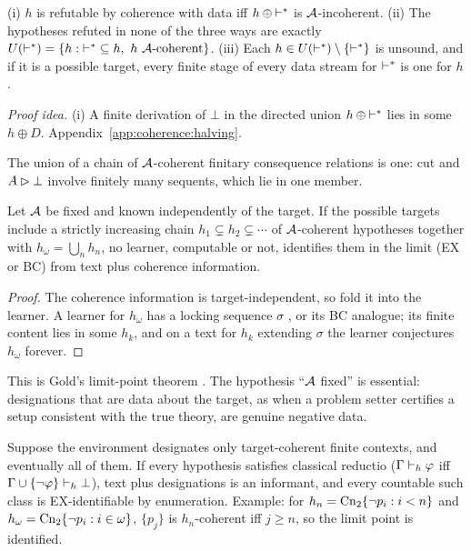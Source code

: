 \begin{theorem}\label{thm:coherence:silent}
\textup{(i)} $h$ is refutable by coherence with data iff $h\oplus{\vdash^{*}}$ is $\mathcal{A}$-incoherent. \textup{(ii)} The hypotheses refuted in none of the three ways are exactly $U(\dstar)=\{h:{\dstar}\subseteq h,\ h\ \Ac\text{-coherent}\}$. \textup{(iii)} Each $h\in U(\vdash^{*})\setminus\{\vdash^{*}\}$ is unsound, and if it is a possible target, every finite stage of every data stream for $\vdash^{*}$ is one for $h$.
\end{theorem}

\noindent\emph{Proof idea.} (i) A finite derivation of $\bot$ in the directed union $h\oplus{\vdash^{*}}$ lies in some $h\oplus D$. Appendix~\ref{app:coherence:halving}.

\begin{proposition}\label{prop:coherence:chains}
The union of a chain of $\mathcal{A}$-coherent finitary consequence relations is one: cut and $A\rhd\bot$ involve finitely many sequents, which lie in one member.
\end{proposition}

\begin{corollary}\label{cor:coherence:limitpoints}
Let $\mathcal{A}$ be fixed and known independently of the target. If the possible targets include a strictly increasing chain $h_1\subsetneq h_2\subsetneq\cdots$ of $\mathcal{A}$-coherent hypotheses together with $h_\omega=\bigcup_nh_n$, no learner, computable or not, identifies them in the limit (EX or BC) from text plus coherence information.
\end{corollary}

\begin{proof}
The coherence information is target-independent, so fold it into the learner. A learner for $h_\omega$ has a locking sequence $\sigma$ \citep{blum1975toward}, or its BC analogue; its finite content lies in some $h_k$, and on a text for $h_k$ extending $\sigma$ the learner conjectures $h_\omega$ forever.
\end{proof}

This is Gold's limit-point theorem \citep{gold1967language}. The hypothesis ``$\mathcal{A}$ fixed'' is essential: designations that are data about the target, as when a problem setter certifies a setup consistent with the true theory, are genuine negative data.

\begin{proposition}\label{prop:coherence:informant}
Suppose the environment designates only target-coherent finite contexts, and eventually all of them. If every hypothesis satisfies classical reductio ($\Gamma\vdash_h\varphi$ iff $\Gamma\cup\{\neg\varphi\}\vdash_h\bot$), text plus designations is an informant, and every countable such class is EX-identifiable by enumeration. Example: for $h_n=\mathrm{Cn}_2\{\neg p_i:i<n\}$ and $h_\omega=\mathrm{Cn}_2\{\neg p_i:i\in\omega\}$, $\{p_j\}$ is $h_n$-coherent iff $j\ge n$, so the limit point is identified.
\end{proposition}

